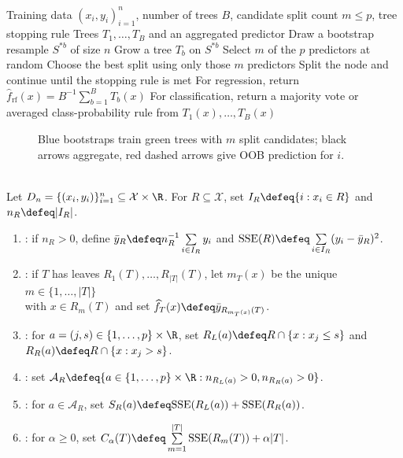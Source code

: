 \begin{breakablealgorithm}
\caption{Random Forest}
\label{alg:sl-random-forest}
\begin{algorithmic}
\Require Training data $(x_i,y_i)_{i=1}^n$, number of trees $B$, candidate split count $m\leq p$, tree stopping rule
\Ensure Trees $T_1,\ldots,T_B$ and an aggregated predictor
\State Draw a bootstrap resample $S^{\ast b}$ of size $n$
\State Grow a tree $T_b$ on $S^{\ast b}$
\State Select $m$ of the $p$ predictors at random
\State Choose the best split using only those $m$ predictors
\State Split the node and continue until the stopping rule is met
\EndFor
\EndFor
\State For regression, return $\widehat{f}_{\mathrm{rf}}(x)=B^{-1}\sum_{b=1}^B T_b(x)$
\State For classification, return a majority vote or averaged class-probability rule from $T_1(x),\ldots,T_B(x)$
\end{algorithmic}
\end{breakablealgorithm}

\begin{figure}[H]
\centering

\caption{\textcolor{cyan!65!black}{Blue} bootstraps train \textcolor{green!45!black}{green} trees with $m$ split candidates; black arrows aggregate, \textcolor{red!70!black}{red dashed} arrows give OOB prediction for $i$.}
\label{fig:sl-random-forest-oob-decorrelation}
\end{figure}

\begin{definition} \label{def:sl-cart-regression-tree-scores} \\
Let $D_n=\{(x_i,y_i)\}_{i=1}^n\subseteq\mathcal{X}\times\R$. For $R\subseteq\mathcal{X}$, set $I_R\defeq\{i:x_i\in R\}$ and $n_R\defeq |I_R|$.
\begin{enumerate}[label=(\roman*)]
\setlength{\itemsep}{0pt}
\item {}: if $n_R>0$, define $\bar y_R\defeq n_R^{-1}\sum\limits_{i\in I_R}y_i$ and $\mathrm{SSE}(R)\defeq\sum\limits_{i\in I_R}(y_i-\bar y_R)^2$.
\item {}: if $T$ has leaves $R_1(T),\ldots,R_{|T|}(T)$, let $m_T(x)$ be the unique $m\in\{1,\ldots,|T|\}$\\
with $x\in R_m(T)$ and set $\widehat{f}_T(x)\defeq\bar y_{R_{m_T(x)}(T)}$.
\item {}: for $a=(j,s)\in\{1,\ldots,p\}\times\R$, set $R_L(a)\defeq R\cap\{x:x_j\leq s\}$ and $R_R(a)\defeq R\cap\{x:x_j>s\}$.
\item {}: set $\mathcal{A}_R\defeq\{a\in\{1,\ldots,p\}\times\R:n_{R_L(a)}>0,n_{R_R(a)}>0\}$.
\item {}: for $a\in\mathcal{A}_R$, set $S_R(a)\defeq\mathrm{SSE}(R_L(a))+\mathrm{SSE}(R_R(a))$.
\item {}: for $\alpha\geq0$, set $C_\alpha(T)\defeq\sum\limits_{m=1}^{|T|}\mathrm{SSE}(R_m(T))+\alpha|T|$.
\end{enumerate}
\end{definition}

